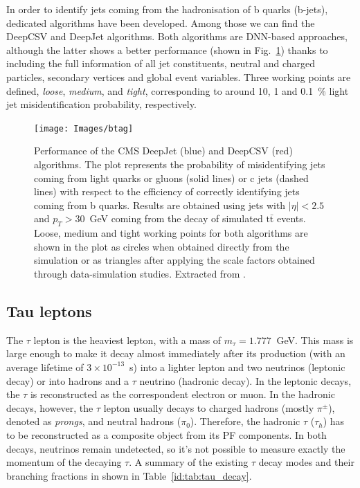 \documentclass[../main.tex]{subfiles}
\begin{document}
In order to identify jets coming from the hadronisation of b quarks (b-jets), dedicated algorithms have been developed. Among those we can find the DeepCSV \cite{intro:id:deepcsv} and DeepJet \cite{intro:id:deepflavour} algorithms. Both algorithms are DNN-based approaches, although the latter shows a better performance (shown in Fig.~\ref{intro:fig:btag}) thanks to including the full information of all jet constituents, neutral and charged particles, secondary vertices and global event variables. Three working points are defined, \textit{loose}, \textit{medium}, and \textit{tight}, corresponding to around 10, 1 and 0.1~\% light jet misidentification probability, respectively.

\begin{figure}[h!]
\begin{center}
\texttt{[image: Images/btag]}
\end{center}
\caption[Performance of the CMS DeepJet and DeepCSV algorithms]{Performance of the CMS DeepJet (blue) and DeepCSV (red) algorithms.  
The plot represents the probability of misidentifying jets coming from light quarks or gluons (solid lines) or c jets (dashed lines) with respect to the efficiency of correctly identifying jets coming from b quarks. Results are obtained using jets with $|\eta|<2.5$ and $p_T>30$~GeV coming from the decay of simulated $\text{t}\bar{\text{t}}$ events. Loose, medium and tight working points for both algorithms are shown in the plot as circles when obtained directly from the simulation or as triangles after applying the scale factors obtained through data-simulation studies. Extracted from \cite{intro:id:deep_csv_jet}.}
\label{intro:fig:btag}
\end{figure}

\subsection{Tau leptons}
\label{intro:subsec:taus}

The $\tau$ lepton is the heaviest lepton, with a mass of $m_\tau = 1.777~$ GeV. This mass is large enough to make it decay almost immediately after its production (with an average lifetime of $3\times10^{-13}$~s) into a lighter lepton and two neutrinos (leptonic decay) or into hadrons and a $\tau$ neutrino (hadronic decay). In the leptonic decays, the $\tau$ is reconstructed as the correspondent electron or muon. In the hadronic decays, however, the $\tau$ lepton usually decays to charged hadrons (mostly $\pi^\pm$), denoted as \textit{prongs}, and neutral hadrons ($\pi_0$). Therefore, the hadronic $\tau$ ($\tau_h$) has to be reconstructed as a composite object from its PF components. In both decays, neutrinos remain undetected, so it's not possible to measure exactly the momentum of the decaying $\tau$. A summary of the existing $\tau$ decay modes and their branching fractions in shown in Table~\ref{id:tab:tau_decay}.
\end{document}
